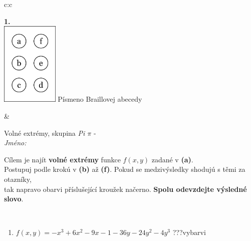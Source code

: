 \documentclass[10pt]{report}
\begin{document}
\begin{tabular}{c:c}
\begin{minipage}[c][104.5mm][t]{0.5\linewidth}
\begin{center}
\begin{minipage}{0.79\linewidth}
\begin{center}
\begin{varwidth}{\linewidth}
\begin{enumerate}
\end{enumerate}
\end{varwidth}
\end{center}
\end{minipage}
\begin{minipage}{0.20\linewidth}
\begin{center}
{\Huge\bfseries 1.} \\[2mm]
\includegraphics[height=40mm]{../images/braille.png}
{\small Písmeno Braillovej abecedy}
\end{center}
\end{minipage}
\end{center}
\end{minipage}
&
\begin{minipage}[c][104.5mm][t]{0.5\linewidth}
\begin{center}
\vspace{7mm}
{\huge Volné extrémy, skupina \textit{Pi $\pi$} -}\\[5mm]
\textit{Jméno:}\phantom{xxxxxxxxxxxxxxxxxxxxxxxxxxxxxxxxxxxxxxxxxxxxxxxxxxxxxxxxxxxxxxxxx}\\[5mm]
\begin{minipage}{0.95\linewidth}
\begin{center}
Cílem je najít \textbf{volné extrémy} funkce $f(x,y)$ zadané v \textbf{(a)}.\\Postupuj podle krokú v \textbf{(b)} až \textbf{(f)}. Pokud se medzivýsledky shodujú s těmi za otazníky,\\tak napravo obarvi příslušející kroužek načerno. \textbf{Spolu odevzdejte výsledné slovo}.
\end{center}
\end{minipage}
\\[1mm]
\begin{minipage}{0.79\linewidth}
\begin{center}
\begin{varwidth}{\linewidth}
\begin{enumerate}
\normalsize
\item $f(x,y)=-x^3+6x^2-9x-1-36y-24y^2-4y^3$\quad \dotfill\; ???\;\dotfill \quad vybarvi

\end{enumerate}
\end{varwidth}
\end{center}
\end{minipage}
\end{center}
\end{minipage}
\end{tabular}
\end{document}
